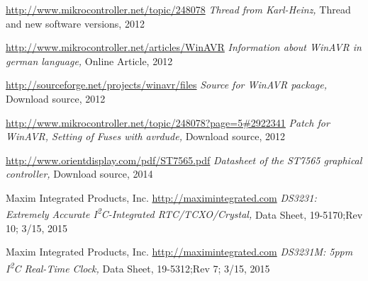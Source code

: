 \documentclass[12pt,a4paper,oneside,english]{report}
\begin{document}
\begin{thebibliography}{99}
\url{http://www.mikrocontroller.net/topic/248078}
\emph{Thread from Karl-Heinz,}
Thread and new software versions,
2012

\url{http://www.mikrocontroller.net/articles/WinAVR}
\emph{Information about WinAVR in german language,}
Online Article,
2012

\url{http://sourceforge.net/projects/winavr/files}
\emph{Source for WinAVR package,}
Download source,
2012

\url{http://www.mikrocontroller.net/topic/248078?page=5#2922341}
\emph{Patch for WinAVR, Setting of Fuses with avrdude,}
Download source,
2012

\url{http://www.orientdisplay.com/pdf/ST7565.pdf}
\emph{Datasheet of the ST7565 graphical controller,}
Download source,
2014

Maxim Integrated Products, Inc.
\url{http://maximintegrated.com}
\emph{DS3231: Extremely Accurate I\textsuperscript{2}C-Integrated RTC/TCXO/Crystal,}
Data Sheet,
19-5170;Rev 10; 3/15,
2015

Maxim Integrated Products, Inc.
\url{http://maximintegrated.com}
\emph{DS3231M: 5ppm I\textsuperscript{2}C Real-Time Clock,}
Data Sheet,
19-5312;Rev 7; 3/15,
2015



\end{thebibliography}
\end{document}
